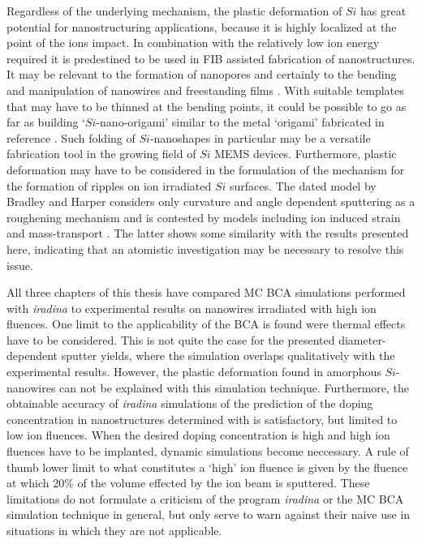 Regardless of the underlying mechanism, the plastic deformation of $Si$ has great potential for nanostructuring applications, because it is highly localized at the point of the ions impact. In combination with the relatively low ion energy required it is predestined to be used in FIB assisted fabrication of nanostructures. It may be relevant to the formation of nanopores \cite{george_nanopore_2010} and certainly to the bending and manipulation of nanowires \cite{cui_ion-beam-induced_2013} and freestanding films \cite{kim_focused_2006}. With suitable templates that may have to be thinned at the bending points, it could be possible to go as far as building `$Si$-nano-origami' similar to the metal `origami' fabricated in reference \cite{chalapat_self-organized_2013}. Such folding of $Si$-nanoshapes in particular may be a versatile fabrication tool in the growing field of $Si$ MEMS devices. Furthermore, plastic deformation may have to be considered in the formulation of the mechanism for the formation of ripples on ion irradiated $Si$ surfaces. The dated model by Bradley and Harper \cite{bradley_theory_1988} considers only curvature and angle dependent sputtering as a roughening mechanism and is contested by models including ion induced strain and mass-transport \cite{norris_stress-induced_2012,kramczynski_wavelength-dependent_2014}. The latter shows some similarity with the results presented here, indicating that an atomistic investigation may be necessary to resolve this issue.

All three chapters of this thesis have compared MC BCA simulations performed with \emph{iradina} to experimental results on nanowires irradiated with high ion fluences. One limit to the applicability of the BCA is found were thermal effects have to be considered. This is not quite the case for the presented diameter-dependent sputter yields, where the simulation overlaps qualitatively with the experimental results. However, the plastic deformation found in amorphous $Si$-nanowires can not be explained with this simulation technique. Furthermore, the obtainable accuracy of \emph{iradina} simulations of the prediction of the doping concentration in nanostructures determined with is satisfactory, but limited to low ion fluences. When the desired doping concentration is high and high ion fluences have to be implanted, dynamic simulations become neccessary. A rule of thumb lower limit to what constitutes a `high' ion fluence is given by the fluence at which $20\%$ of the volume effected by the ion beam is sputtered. These limitations do not formulate a criticism of the program \emph{iradina} or the MC BCA simulation technique in general, but only serve to warn against their naive use in situations in which they are not applicable.
 


